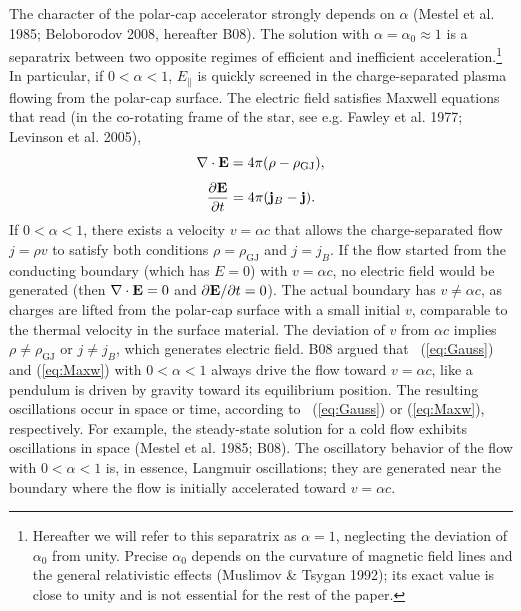 The character of the polar-cap accelerator strongly depends on $\alpha$
  (Mestel et al. 1985; Beloborodov 2008, hereafter B08).
The solution with $\alpha=\alpha_0\approx 1$ is a separatrix between two
opposite regimes of efficient and inefficient acceleration.\footnote{
      Hereafter we will refer to this separatrix as $\alpha=1$, neglecting the
      deviation of $\alpha_0$ from unity. Precise $\alpha_0$ depends on
      the curvature of magnetic field lines and the general
      relativistic effects
          (Muslimov \& Tsygan 1992);
      its exact value is close to unity and
      is not essential for the rest of the paper.}
In particular,  if $0<\alpha<1$, $E_\parallel$ is quickly screened in the
charge-separated plasma flowing from the polar-cap surface. The electric field
satisfies
Maxwell equations that read
  (in the co-rotating frame of the star, see e.g. Fawley et al. 1977; Levinson et al. 2005),
\begin{equation}
\label{eq:Gauss}
   \nabla\cdot{\mathbf E}=4\pi(\rho-\rho_\mathrm{GJ}),
 \end{equation}
 \begin{equation}
 \label{eq:Maxw}
   \frac{\partial{\mathbf E}}{\partial t}=4\pi(\mathbf{j}_B-\mathbf{j}).
\end{equation}
If $0<\alpha<1$, there exists a velocity $v=\alpha c$ that allows the charge-separated
flow $j=\rho v$ to satisfy both conditions $\rho=\rho_\mathrm{GJ}$ and $j=j_B$.
If the flow started from the conducting boundary (which has $E=0$) with
$v=\alpha c$, no electric field would be generated (then $\nabla\cdot{\mathbf E}=0$
and $\partial{\mathbf E}/\partial t=0$). The actual boundary has $v\neq \alpha c$, as
charges are lifted from the polar-cap surface with a small initial $v$,
comparable to the thermal velocity in the surface material.
The deviation of $v$ from $\alpha c$ implies $\rho\neq\rho_\mathrm{GJ}$ or
$j\neq j_B$, which generates electric field.
B08 argued that
\Eqs~(\ref{eq:Gauss}) and (\ref{eq:Maxw}) with $0<\alpha<1$
always drive the flow toward $v=\alpha c$,
like a pendulum is driven by gravity toward its equilibrium position.
The resulting oscillations occur in space or time,
according to \Eqs~(\ref{eq:Gauss}) or (\ref{eq:Maxw}), respectively.
For example, the steady-state solution for a cold flow exhibits
oscillations in space
   (Mestel et al. 1985; B08).
The oscillatory behavior of the flow with $0<\alpha<1$ is, in essence, Langmuir
oscillations; they are generated near the boundary where the flow is initially
accelerated toward $v=\alpha c$.

